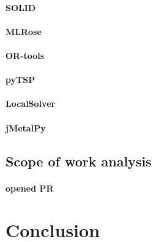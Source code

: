\paragraph{SOLID}
\paragraph{MLRose}
\paragraph{OR-tools}
\paragraph{pyTSP}
\paragraph{LocalSolver}
\paragraph{jMetalPy}

\subsection{Scope of work analysis}
\paragraph{opened PR}

\section{Conclusion}
